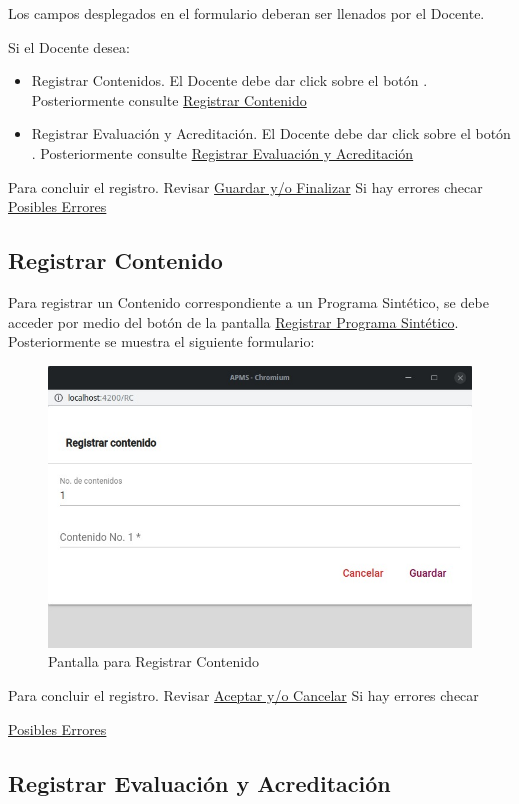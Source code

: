 Los campos desplegados en el formulario deberan ser llenados por el Docente.

Si el Docente desea:

\begin{itemize}
    \item Registrar Contenidos. El Docente debe dar click sobre el botón . Posteriormente consulte \hyperlink{RegC}{Registrar Contenido}
    \item Registrar Evaluación y Acreditación. El Docente debe dar click sobre el botón . Posteriormente consulte \hyperlink{RegEyA}{Registrar Evaluación y Acreditación}
\end{itemize}


Para concluir el registro. Revisar \hyperlink{GuardarFinalizar}{Guardar y/o Finalizar}
Si hay errores checar \hyperlink{Errores}{Posibles Errores}

\pagebreak
\hypertarget{RegC}{\subsection{Registrar Contenido}}

Para registrar un Contenido correspondiente a un Programa Sintético, se debe acceder por medio del botón  de la pantalla \hyperlink{RegistrarPS}{Registrar Programa Sintético}. Posteriormente se muestra el siguiente formulario: 

\begin{figure}[H]
    \centering
    \hypertarget{RegC}{\includegraphics[width=0.5\linewidth]{images/SP6/11.jpeg}}
    \caption{Pantalla para Registrar Contenido}
\end{figure}

Para concluir el registro. Revisar \hyperlink{AceptarCancelar}{Aceptar y/o Cancelar}
Si hay errores checar

\hyperlink{Errores}{Posibles Errores}

\pagebreak
\hypertarget{RegEyA}{\subsection{Registrar Evaluación y Acreditación}}

